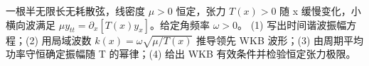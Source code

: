 一根半无限长无耗散弦，线密度 \(\mu>0\) 恒定，张力 \(T(x)>0\) 随 x 缓慢变化，小横向波满足 \(\mu y_{tt}=\partial_x[T(x)y_x]\)。给定角频率 \(\omega >0\)。
(1) 写出时间谐波振幅方程；(2) 用局域波数 \(k(x)=\omega\sqrt{\mu/T(x)}\) 推导领先 WKB 波形；(3) 由周期平均功率守恒确定振幅随 T 的幂律；(4) 给出 WKB 有效条件并检验恒定张力极限。
